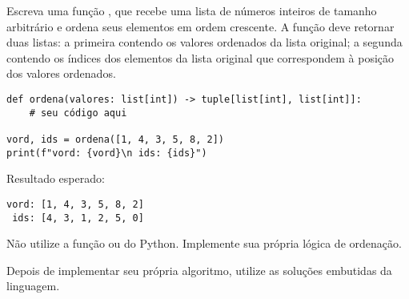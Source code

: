 Escreva uma função  , que recebe uma lista de números inteiros de tamanho arbitrário e ordena
seus elementos em ordem crescente.
A função deve retornar duas listas: a primeira contendo os valores ordenados da lista original; a segunda contendo os
índices dos elementos da lista original que correspondem à posição dos valores ordenados.

\begin{verbatim}
def ordena(valores: list[int]) -> tuple[list[int], list[int]]:
    # seu código aqui

vord, ids = ordena([1, 4, 3, 5, 8, 2])
print(f"vord: {vord}\n ids: {ids}")
\end{verbatim}

Resultado esperado:
\begin{verbatim}
vord: [1, 4, 3, 5, 8, 2]
 ids: [4, 3, 1, 2, 5, 0]
\end{verbatim}

Não utilize a função  ou  do Python.
Implemente sua própria lógica de ordenação.

Depois de implementar seu própria algoritmo, utilize as soluções embutidas da linguagem.

